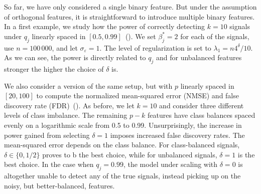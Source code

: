 So far, we have only considered a single binary feature. But under the assumption of
orthogonal features, it is straightforward to introduce multiple binary features. In a
first example, we study how the power of correctly detecting \(k=10\) signals under \(q_j\)
linearly spaced in \([0.5, 0.99]\)~(). We set \(\beta^*_j = 2\) for
each of the signals, use \(n = 100\,000\), and let \(\sigma_\varepsilon = 1\). The level of
regularization is set to \(\lambda_1 = n 4^\delta/10\). As we can see, the power is
directly related to \(q_j\) and for unbalanced features stronger the higher the choice of
\(\delta\) is.

We also consider a version of the same setup, but with \(p\) linearly spaced in \([20,
    100]\) to compute the normalized mean-squared error (NMSE) and false discovery rate
(FDR)~(). As before, we let \(k = 10\) and consider three
different levels of class imbalance. The remaining \(p-k\) features have class balances
spaced evenly on a logarithmic scale from 0.5 to 0.99. Unsurprisingly, the increase in
power gained from selecting \(\delta = 1\) imposes increased false discovery rates. The
mean-squared error depends on the class balance. For class-balanced signals, \(\delta \in
\{0, 1/2\}\) proves to b the best choice, while for unbalanced signals, \(\delta = 1\) is
the best choice. In the case when \(q_j = 0.99\), the model under scaling with \(\delta =
0\) is altogether unable to detect any of the true signals, instead picking up on the
noisy, but better-balanced, features.

